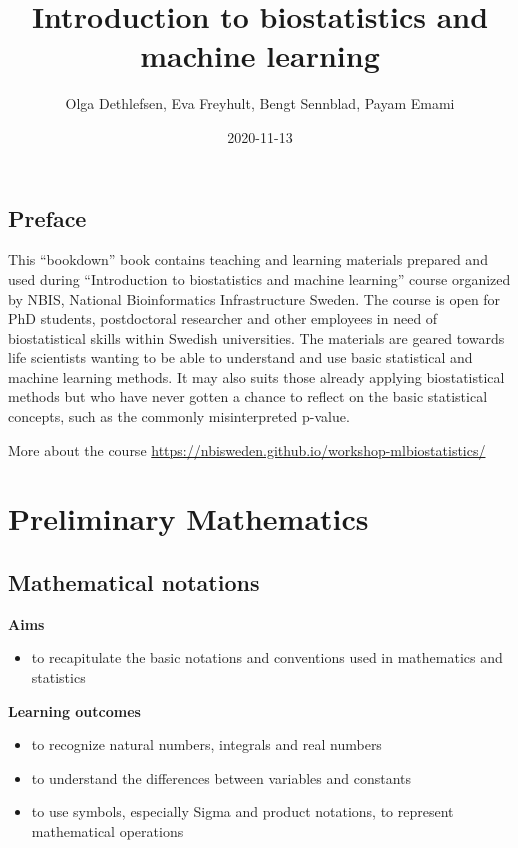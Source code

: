 \documentclass[
]{book}
\title{Introduction to biostatistics and machine learning}
\author{Olga Dethlefsen, Eva Freyhult, Bengt Sennblad, Payam Emami}
\date{2020-11-13}
\providecommand{\tightlist}{%
  \setlength{\itemsep}{0pt}\setlength{\parskip}{0pt}}
\theoremstyle{definition}
\theoremstyle{definition}
\theoremstyle{definition}
\theoremstyle{remark}
\begin{document}
\maketitle

{
\setcounter{tocdepth}{1}
\tableofcontents
}
\hypertarget{preface}{%
\chapter*{Preface}\label{preface}}

This ``bookdown'' book contains teaching and learning materials prepared and used during ``Introduction to biostatistics and machine learning'' course organized by NBIS, National Bioinformatics Infrastructure Sweden. The course is open for PhD students, postdoctoral researcher and other employees in need of biostatistical skills within Swedish universities. The materials are geared towards life scientists wanting to be able to understand and use basic statistical and machine learning methods. It may also suits those already applying biostatistical methods but who have never gotten a chance to reflect on the basic statistical concepts, such as the commonly misinterpreted p-value.

More about the course \url{https://nbisweden.github.io/workshop-mlbiostatistics/}

\hypertarget{part-preliminary-mathematics}{%
\part{Preliminary Mathematics}\label{part-preliminary-mathematics}}

\hypertarget{mathematical-notations}{%
\chapter{Mathematical notations}\label{mathematical-notations}}

\textbf{Aims}

\begin{itemize}
\tightlist
\item
  to recapitulate the basic notations and conventions used in mathematics and statistics
\end{itemize}

\textbf{Learning outcomes}

\begin{itemize}
\tightlist
\item
  to recognize natural numbers, integrals and real numbers
\item
  to understand the differences between variables and constants
\item
  to use symbols, especially Sigma and product notations, to represent mathematical operations
\end{itemize}
\end{document}
